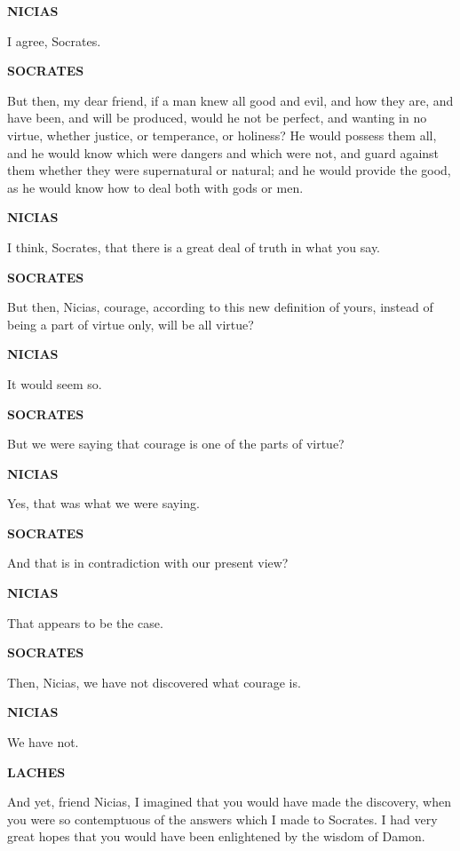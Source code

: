 \documentclass[11pt,letter]{book}
\begin{document}
\par \textbf{NICIAS}
\par   I agree, Socrates.

\par \textbf{SOCRATES}
\par   But then, my dear friend, if a man knew all good and evil, and how they are, and have been, and will be produced, would he not be perfect, and wanting in no virtue, whether justice, or temperance, or holiness? He would possess them all, and he would know which were dangers and which were not, and guard against them whether they were supernatural or natural; and he would provide the good, as he would know how to deal both with gods or men.

\par \textbf{NICIAS}
\par   I think, Socrates, that there is a great deal of truth in what you say.

\par \textbf{SOCRATES}
\par   But then, Nicias, courage, according to this new definition of yours, instead of being a part of virtue only, will be all virtue?

\par \textbf{NICIAS}
\par   It would seem so.

\par \textbf{SOCRATES}
\par   But we were saying that courage is one of the parts of virtue?

\par \textbf{NICIAS}
\par   Yes, that was what we were saying.

\par \textbf{SOCRATES}
\par   And that is in contradiction with our present view?

\par \textbf{NICIAS}
\par   That appears to be the case.

\par \textbf{SOCRATES}
\par   Then, Nicias, we have not discovered what courage is.

\par \textbf{NICIAS}
\par   We have not.

\par \textbf{LACHES}
\par   And yet, friend Nicias, I imagined that you would have made the discovery, when you were so contemptuous of the answers which I made to Socrates. I had very great hopes that you would have been enlightened by the wisdom of Damon.
\end{document}
